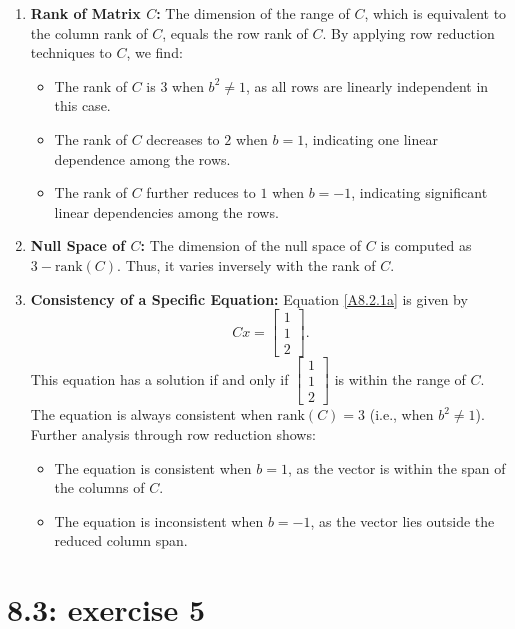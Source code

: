 \documentclass{report}
\begin{document}
\begin{enumerate}
    \item \textbf{Rank of Matrix $C$:} The dimension of the range of $C$, which is equivalent to the column rank of $C$, equals the row rank of $C$. By applying row reduction techniques to $C$, we find:
    \begin{itemize}
        \item The rank of $C$ is $3$ when $b^2 \neq 1$, as all rows are linearly independent in this case.
        \item The rank of $C$ decreases to $2$ when $b = 1$, indicating one linear dependence among the rows.
        \item The rank of $C$ further reduces to $1$ when $b = -1$, indicating significant linear dependencies among the rows.
    \end{itemize}
    
    \item \textbf{Null Space of $C$:} The dimension of the null space of $C$ is computed as $3 - \text{rank}(C)$. Thus, it varies inversely with the rank of $C$.

\item \textbf{Consistency of a Specific Equation:}
    Equation \eqref{A8.2.1a} is given by
    \[
    Cx = \begin{bmatrix} 1 \\ 1 \\ 2 \end{bmatrix}.
    \]
    This equation has a solution if and only if $\begin{bmatrix} 1 \\ 1 \\ 2 \end{bmatrix}$ is within the range of $C$. The equation is always consistent when $\text{rank}(C) = 3$ (i.e., when $b^2 \neq 1$). Further analysis through row reduction shows:
    \begin{itemize}
        \item The equation is consistent when $b = 1$, as the vector is within the span of the columns of $C$.
        \item The equation is inconsistent when $b = -1$, as the vector lies outside the reduced column span.
    \end{itemize}
\end{enumerate}

\section*{8.3: exercise 5} 
\end{document}
